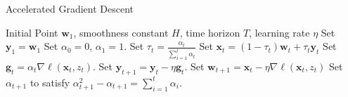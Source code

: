 \documentclass[letterpaper]{article}
\newcommand{\bx}{\mathbf{x}}
\newcommand{\by}{\mathbf{y}}
\newcommand{\bw}{\mathbf{w}}
\newcommand{\bg}{\mathbf{g}}
\begin{document}
\begin{algorithm}
   \caption{Accelerated Gradient Descent}
   \begin{algorithmic}
       Initial Point $\bw_1$, smoothness constant $H$, time horizon $T$, learning rate $\eta$
      \STATE Set $\by_1=\bw_1$
      \STATE Set $\alpha_0=0$, $\alpha_1=1$.
      \STATE Set $\tau_t = \frac{\alpha_t}{\sum_{i=1}^t \alpha_t}$
      \STATE Set $\bx_t = (1-\tau_t)\bw_t + \tau_t \by_t$
      \STATE Set $\bg_t = \alpha_t \nabla \ell(\bx_t, z_t)$.
      \STATE Set $\by_{t+1} = \by_t  -  \eta \bg_t$.
      \STATE Set $\bw_{t+1} = \bx_t - \eta \nabla \ell(\bx_t, z_t)$
      \STATE Set $\alpha_{t+1}$ to satisfy $\alpha_{t+1}^2 - \alpha_{t+1} = \sum_{i=1}^t \alpha_i$.
      \ENDFOR
   \end{algorithmic}
\label{alg:momentumAGD}
\end{algorithm}
\end{document}
